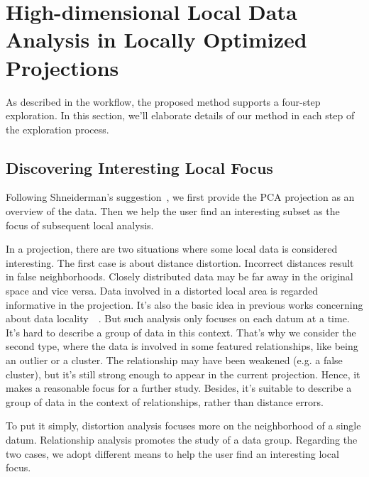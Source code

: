 \section{High-dimensional Local Data Analysis in Locally Optimized Projections}
As described in the workflow, the proposed method supports a four-step exploration. In this section, we'll elaborate details of our method in each step of the exploration process.
\label{section:method}
\subsection{Discovering Interesting Local Focus}
Following Shneiderman's suggestion~\cite{DBLP:conf/vl/Shneiderman96}, we first provide the PCA projection as an overview of the data. Then we help the user find an interesting subset as the focus of subsequent local analysis.

In a projection, there are two situations where some local data is considered interesting. The first case is about distance distortion. Incorrect distances result in false neighborhoods. Closely distributed data may be far away in the original space and vice versa. Data involved in a distorted local area is regarded informative in the projection. It's also the basic idea in previous works concerning about data locality~\cite{DBLP:journals/cg/MartinsCMT14}~\cite{DBLP:journals/tvcg/StahnkeDMT16}. But such analysis only focuses on each datum at a time. It's hard to describe a group of data in this context. That's why we consider the second type, where the data is involved in some featured relationships, like being an outlier or a cluster. The relationship may have been weakened (e.g. a false cluster), but it's still strong enough to appear in the current projection. Hence, it makes a reasonable focus for a further study. Besides, it's suitable to describe a group of data in the context of relationships, rather than distance errors.

To put it simply, distortion analysis focuses more on the neighborhood of a single datum. Relationship analysis promotes the study of a data group. Regarding the two cases, we adopt different means to help the user find an interesting local focus.

